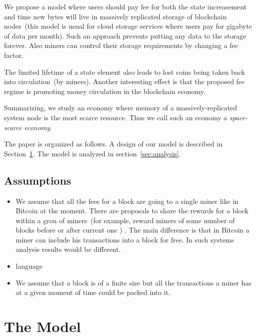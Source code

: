 \documentclass[]{article}   %
\newcommand{\authnote}[2]{\marginpar{\parbox{\marginparwidth}{\tiny %
  \textsf{#1 {\textcolor{blue}{notes: #2}}}}}%
  \textcolor{blue}{\textbf{\dag}}}
\newcommand{\authnote}[2]{
  \textsf{#1 \textcolor{blue}{: #2}}}
\newcommand{\authnote}[2]{}
\newcommand{\knote}[1]{{\authnote{\textcolor{green}{Alex notes}}{#1}}}
\begin{document}
We propose a model where users should pay fee for both the state increasement and time new bytes will live in massively replicated storage of blockchain nodes~(this model is usual for cloud storage services where users pay for gigabyte of data per month). Such an approach prevents putting any data to the storage forever. Also miners can control their storage requirements by changing a fee factor. 

The limited lifetime of a state element also leads to lost coins being taken back into circulation~(by miners). Another interesting effect is that the proposed fee regime is promoting money circulation in the blockchain economy.

Summarizing, we study an economy where memory of a massively-replicated system node is the most scarce resource. Thus we call such an economy a \textit{space-scarce economy}.  

The paper is organized as follows. A design of our model is described in Section~\ref{sec:model}. The model is analyzed in section~\ref{sec:analysis}.  \knote{finish}

\knote{note that we're talking about minimal fees}

\subsection{Assumptions}
\begin{itemize}
  \item{} We assume that all the fees for a block are going to a single miner like in Bitcoin at the moment. There are proposals to share the rewards for a block within a grou of miners~(for example, reward miners of some number of blocks before or after current one \cite{eyal2016bitcoin, kogias2016enhancing})\knote{links to Bitcoin-NG, ByzCoin}. The main difference is that in Bitcoin a miner can include his transactions into a block for free. In such systems analysis results would be different.
  \item{language} \knote{TODO: fill the description}
  \item{} We assume that a block is of a finite size but all the transactions a miner has at a given moment of time could be packed into it. 
\end{itemize}


\section{The Model}
\label{sec:model}
\end{document}
